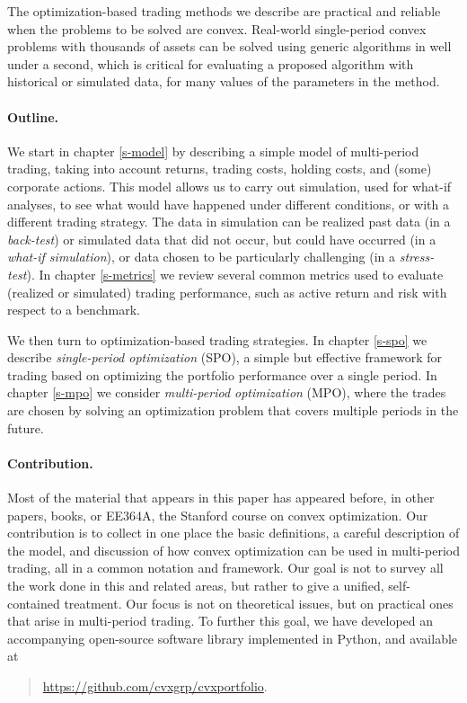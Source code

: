 \documentclass[openany]{now}
\begin{document}
The optimization-based trading methods we describe are practical
and reliable when the problems to be solved are convex.
Real-world single-period convex problems with thousands of assets can be
solved using generic algorithms in well under a second,
which is critical for evaluating
a proposed algorithm with historical or simulated data, for many values of
the parameters in the method.

\paragraph{Outline.}
We start in chapter \ref{s-model} by describing a simple model of
multi-period trading, taking into account returns, trading costs,
holding costs, and (some) corporate actions.
This model allows us to carry out simulation, used
for what-if analyses, to see what would have happened
under different conditions, or with a different trading strategy.
The data in simulation can be realized past data (in a \emph{back-test})
or simulated data that did not occur, but could have occurred
(in a \emph{what-if simulation}), or data chosen to be particularly
challenging (in a \emph{stress-test}).
In chapter \ref{s-metrics} we review several common metrics used to evaluate
(realized or simulated)
trading performance, such as active return and risk with respect to
a benchmark.

We then turn to optimization-based trading strategies.
In chapter \ref{s-spo} we describe \emph{single-period optimization} (SPO),
a simple but effective framework for trading based on
optimizing the portfolio performance over a single period.
In chapter \ref{s-mpo} we consider \emph{multi-period optimization} (MPO),
where the trades are chosen by solving an optimization problem
that covers multiple periods in the future.


\paragraph{Contribution.}
Most of the material that appears in this paper has appeared
before, in other papers, books, or EE364A, the Stanford course on
convex optimization.  Our contribution is to collect in one place
the basic definitions, a careful description of the model,
and discussion of how convex optimization
can be used in multi-period trading, all in a
common notation and framework.  Our goal is not to survey all the work
done in this and related areas, but rather to give a unified,
self-contained treatment.  Our focus is not on theoretical issues,
but on practical ones that arise in multi-period trading.
To further this goal,
we have developed an accompanying open-source software library
implemented in Python, and available at
\begin{quote}
\url{https://github.com/cvxgrp/cvxportfolio}.
\end{quote}
\end{document}

